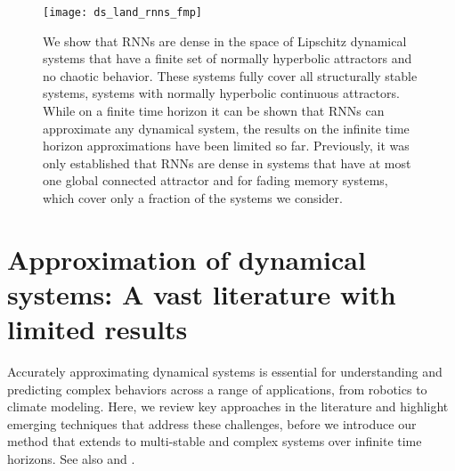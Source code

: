 \documentclass{article}
\newcounter{ct}
\begin{document}



\setlength\belowcaptionskip{-5ex}
\begin{figure}
  \centering
  \texttt{[image: ds\_land\_rnns\_fmp]}
  \caption{We show that RNNs are dense in the space of Lipschitz dynamical systems that have a finite set of normally hyperbolic attractors and no chaotic behavior.
  These systems fully cover all structurally stable systems, systems with normally hyperbolic continuous attractors.
  While on a finite time horizon it can be shown that RNNs can approximate any dynamical system, the results on the infinite time horizon approximations have been limited so far.
  Previously, it was only established that RNNs are dense in systems that have at most one global connected attractor and for fading memory systems, which cover only a fraction of the systems we consider.
  }\label{fig:ds_land_rnns_fmp}
\end{figure}




\section{Approximation of dynamical systems: A vast literature with limited results}
Accurately approximating dynamical systems is essential for understanding and predicting complex behaviors across a range of applications, from robotics to climate modeling.
Here, we review key approaches in the literature and highlight emerging techniques that address these challenges, before we introduce our method that extends to multi-stable and complex systems over infinite time horizons.
See also  \citep{li2022approximation} and  \citep{jiang2023brief}.
\end{document}
